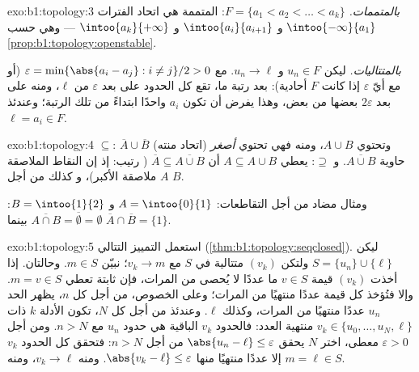 \begin{solution}{exo:b1:topology:3}
\emph{بالمتممات.} $F = \{a_1 < a_2 < \dots < a_k\}$: المتممة
هي اتحاد الفترات  $\intoo{-\infty}{a_1}$ و
$\intoo{a_i}{a_{i+1}}$ و $\intoo{a_k}{+\infty}$ --- وهي  حسب
\cref{prop:b1:topology:openstable}.

\emph{بالمتتاليات.} ليكن $u_n \in F$ و $u_n \to \ell$. مع $\varepsilon
= \min\{\abs{a_i - a_j} : i \neq j\}/2 > 0$ (أو مع أيّ $\varepsilon$ إذا كانت
$F$ أحادية): بعد رتبة ما، تقع كل الحدود على بعد
$\varepsilon$ من $\ell$، ومنه على بعد $2\varepsilon$ بعضها من بعض،
وهذا يفرض أن تكون $a_i$ واحدًا ابتداءً من تلك الرتبة؛ وعندئذ
$\ell = a_i \in F$.
\end{solution}

\begin{solution}{exo:b1:topology:4}
$\subseteq$:  $\overline A \cup \overline B$  (اتحاد منته)
وتحتوي $A \cup B$، ومنه فهي تحتوي \emph{أصغر} حاوية 
$\overline{A \cup B}$. و $\supseteq$: يعطي $A \subseteq A \cup B$
أن $\overline A \subseteq \overline{A \cup B}$ (
رتيب: إذ إن النقاط الملاصقة  $A$ ملاصقة  الأكبر)، و
كذلك من أجل $B$.

ومثال مضاد من أجل التقاطعات: $A = \intoo{0}{1}$ و $B =
\intoo{1}{2}$: $\overline{A \cap B} = \overline\emptyset = \emptyset$
بينما $\overline A \cap \overline B = \{1\}$.
\end{solution}

\begin{solution}{exo:b1:topology:5}
استعمل التمييز التتالي
(\cref{thm:b1:topology:seqclosed}). ليكن $S = \{u_n\} \cup \{\ell\}$
ولتكن $(v_k)$ متتالية في $S$ مع $v_k \to m$؛ نبيّن $m \in S$. وحالتان.
إذا أخذت $(v_k)$ قيمة $v \in S$ ما عددًا لا يُحصى من المرات،
فإن  ثابتة تعطي $m = v \in S$. وإلا فتُؤخذ كل
قيمة عددًا منتهيًا من المرات؛ وعلى الخصوص، من أجل كل $n$، يظهر الحد
$u_n$ عددًا منتهيًا من المرات، وكذلك $\ell$. وعندئذ من أجل كل $N$، تكون
الأدلة $k$ ذات $v_k \in \{u_0, \dots, u_N, \ell\}$ منتهية
العدد: فالحدود $v_k$ الباقية هي حدود $u_n$ مع $n > N$. ومن أجل
$\varepsilon > 0$ معطى، اختر $N$ يحقق $\abs{u_n - \ell} \leq
\varepsilon$ من أجل $n > N$: فتحقق كل الحدود $v_k$ إلا عددًا منتهيًا منها
$\abs{v_k - \ell} \leq \varepsilon$. ومنه $v_k \to \ell$، ومنه $m =
\ell \in S$.
\end{solution}

